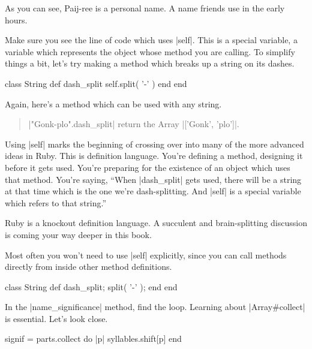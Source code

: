\documentclass[12pt,twoside]{report}
\begin{document}
As you can see, Paij-ree is a personal name.  A name friends use in
the early hours.

Make sure you see the line of code which uses
\rubyinline|self|.  This is a special variable, a
variable which represents the object whose method you are calling.  To
simplify things a bit, let's try making a method which breaks up a
string on its dashes.


\begin{rubycode}

 class String
   def dash_split
     self.split( '-' )
   end
 end

\end{rubycode}


Again, here's a method which can be used with any string.

\begin{quote}
\rubyinline|"Gonk-plo".dash_split| return the Array
\rubyinline|['Gonk', 'plo']|.\end{quote}


Using \rubyinline|self| marks the beginning of
crossing over into many of the more advanced ideas in Ruby. This is
definition language.  You're defining a method, designing it before it
gets used.  You're preparing for the existence of an object which uses
that method.  You're saying, ``When
\rubyinline|dash_split| gets used, there will be a
string at that time which is the one we're dash-splitting.  And
\rubyinline|self| is a special variable which refers
to that string.''

Ruby is a knockout definition language.  A succulent and
brain-splitting discussion is coming your way deeper in this book.

Most often you won't need to use \rubyinline|self|
explicitly, since you can call methods directly from inside other
method definitions.


\begin{rubycode}

 class String
   def dash_split; split( '-' ); end
 end

\end{rubycode}


In the \rubyinline|name_significance| method, find the
loop.  Learning about \rubyinline|Array#collect| is
essential. Let's look close.


\begin{rubycode}

 signif = parts.collect do |p|
   syllables.shift[p]
 end

\end{rubycode}
\end{document}
